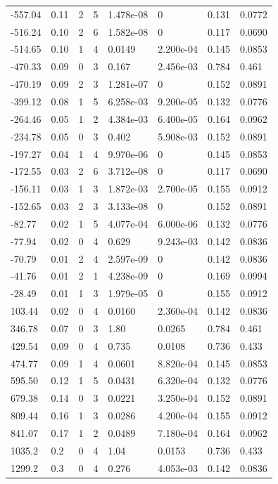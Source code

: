 \documentclass[preview]{standalone}
\begin{document}
{{\begin{tabular}{L{1.2cm}C{1.2cm} C{0.3cm}C{0.5cm} C{1.4cm}C{1.4cm} C{1.4cm}C{1.4cm}}
  -557.04  &  0.11  & 2     &  5 &  1.478e-08  & 0  & 0.131 &  0.0772   \\ 
  -516.24  &  0.10  & 2     &  6 &  1.582e-08  & 0  & 0.117 &  0.0690   \\ 
  -514.65  &  0.10  & 1     &  4 &  0.0149  & 2.200e-04  & 0.145 &  0.0853   \\ 
  -470.33  &  0.09  & 0     &  3 &  0.167  & 2.456e-03  & 0.784 &  0.461   \\ 
  -470.19  &  0.09  & 2     &  3 &  1.281e-07  & 0  & 0.152 &  0.0891   \\ 
  -399.12  &  0.08  & 1     &  5 &  6.258e-03  & 9.200e-05  & 0.132 &  0.0776   \\ 
  -264.46  &  0.05  & 1     &  2 &  4.384e-03  & 6.400e-05  & 0.164 &  0.0962   \\ 
  -234.78  &  0.05  & 0     &  3 &  0.402  & 5.908e-03  & 0.152 &  0.0891   \\ 
  -197.27  &  0.04  & 1     &  4 &  9.970e-06  & 0  & 0.145 &  0.0853   \\ 
  -172.55  &  0.03  & 2     &  6 &  3.712e-08  & 0  & 0.117 &  0.0690   \\ 
  -156.11  &  0.03  & 1     &  3 &  1.872e-03  & 2.700e-05  & 0.155 &  0.0912   \\ 
  -152.65  &  0.03  & 2     &  3 &  3.133e-08  & 0  & 0.152 &  0.0891   \\ 
  -82.77  &  0.02  & 1     &  5 &  4.077e-04  & 6.000e-06  & 0.132 &  0.0776   \\ 
  -77.94  &  0.02  & 0     &  4 &  0.629  & 9.243e-03  & 0.142 &  0.0836   \\ 
  -70.79  &  0.01  & 2     &  4 &  2.597e-09  & 0  & 0.142 &  0.0836   \\ 
  -41.76  &  0.01  & 2     &  1 &  4.238e-09  & 0  & 0.169 &  0.0994   \\ 
  -28.49  &  0.01  & 1     &  3 &  1.979e-05  & 0  & 0.155 &  0.0912   \\ 
  103.44  &  0.02  & 0     &  4 &  0.0160  & 2.360e-04  & 0.142 &  0.0836   \\ 
  346.78  &  0.07  & 0     &  3 &  1.80  & 0.0265  & 0.784 &  0.461   \\ 
  429.54  &  0.09  & 0     &  4 &  0.735  & 0.0108  & 0.736 &  0.433   \\ 
  474.77  &  0.09  & 1     &  4 &  0.0601  & 8.820e-04  & 0.145 &  0.0853   \\ 
  595.50  &  0.12  & 1     &  5 &  0.0431  & 6.320e-04  & 0.132 &  0.0776   \\ 
  679.38  &  0.14  & 0     &  3 &  0.0221  & 3.250e-04  & 0.152 &  0.0891   \\ 
  809.44  &  0.16  & 1     &  3 &  0.0286  & 4.200e-04  & 0.155 &  0.0912   \\ 
  841.07  &  0.17  & 1     &  2 &  0.0489  & 7.180e-04  & 0.164 &  0.0962   \\ 
  1035.2  &   0.2  & 0     &  4 &  1.04  & 0.0153  & 0.736 &  0.433   \\ 
  1299.2  &   0.3  & 0     &  4 &  0.276  & 4.053e-03  & 0.142 &  0.0836   \\ 
\hline 
\end{tabular} 

}}
\end{document}
